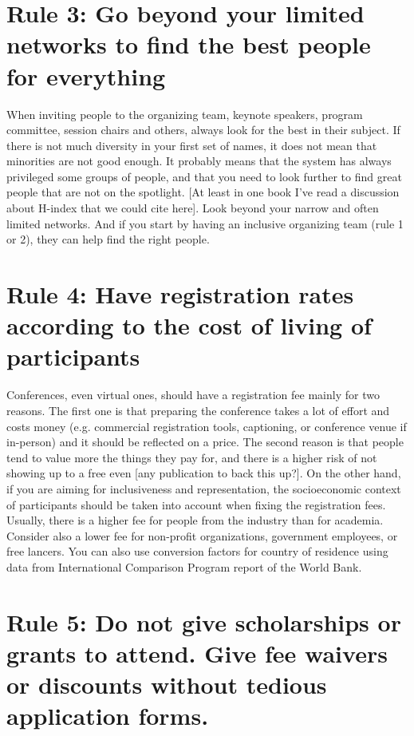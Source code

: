 \documentclass[10pt,letterpaper]{article}
\begin{document}
\section*{Rule 3: Go beyond your limited networks to find the best people for everything}

When inviting people to the organizing team, keynote speakers, program committee, session chairs and others, always look for the best in their subject. If there is not much diversity in your first set of names, it does not mean that minorities are not good enough. It probably means that the system has always privileged some groups of people, and that you need to look further to find great people that are not on the spotlight. [At least in one book I've read a discussion about H-index that we could cite here]. Look beyond your narrow and often limited networks. And if you start by having an inclusive organizing team (rule 1 or 2), they can help find the right people. 


\section*{Rule 4: Have registration rates according to the cost of living of participants}

Conferences, even virtual ones, should have a registration fee mainly for two reasons. The first one is that preparing the conference takes a lot of effort and costs money (e.g. commercial registration tools, captioning, or conference venue if in-person) and it should be reflected on a price. The second reason is that people tend to value more the things they pay for, and there is a higher risk of not showing up to a free even [any publication to back this up?]. On the other hand, if you are aiming for inclusiveness and representation, the socioeconomic context of participants should be taken into account when fixing the registration fees. Usually, there is a higher fee for people from the industry than for academia. Consider also a lower fee for non-profit organizations, government employees, or free lancers. 
You can also use conversion factors for country of residence using data from International Comparison Program report of the World Bank. 

\section*{Rule 5: Do not give scholarships or grants to attend. Give fee waivers or discounts without tedious application forms.}
\end{document}
